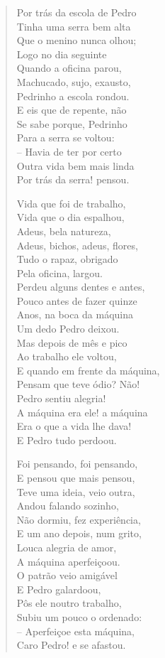 {\begin{verse}
Por trás da escola de Pedro\\
Tinha uma serra bem alta\\
Que o menino nunca olhou;\\
Logo no dia seguinte\\
Quando a oficina parou,\\
Machucado, sujo, exausto,\\
Pedrinho a escola rondou.\\
E eis que de repente, não\\
Se sabe porque, Pedrinho\\
Para a serra se voltou:\\
-- Havia de ter por certo\\
Outra vida bem mais linda\\
Por trás da serra! pensou.

Vida que foi de trabalho,\\
Vida que o dia espalhou,\\
Adeus, bela natureza,\\
Adeus, bichos, adeus, flores,\\
Tudo o rapaz, obrigado\\
Pela oficina, largou.\\
Perdeu alguns dentes e antes,\\
Pouco antes de fazer quinze\\
Anos, na boca da máquina\\
Um dedo Pedro deixou.\\
Mas depois de mês e pico\\
Ao trabalho ele voltou,\\
E quando em frente da máquina,\\
Pensam que teve ódio? Não!\\
Pedro sentiu alegria!\\
A máquina era ele! a máquina\\
Era o que a vida lhe dava!\\
E Pedro tudo perdoou.

Foi pensando, foi pensando,\\
E pensou que mais pensou,\\
Teve uma ideia, veio outra,\\
Andou falando sozinho,\\
Não dormiu, fez experiência,\\
E um ano depois, num grito,\\
Louca alegria de amor,\\
A máquina aperfeiçoou.\\
O patrão veio amigável\\
E Pedro galardoou,\\
Pôs ele noutro trabalho,\\
Subiu um pouco o ordenado:\\
-- Aperfeiçoe esta máquina,\\
Caro Pedro! e se afastou.


\end{verse}}

